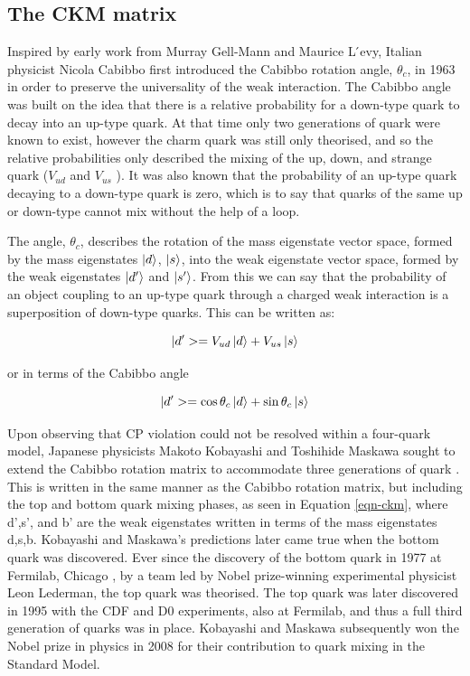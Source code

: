 \subsection{The CKM matrix}

Inspired by early work from Murray Gell-Mann and Maurice L ́evy, Italian physicist Nicola Cabibbo first introduced the Cabibbo rotation angle, $θ_c$, in 1963 \cite{PhysRevLett.10.531} in order to preserve the universality of the weak interaction. The Cabibbo angle was built on the idea that there is a relative probability for a down-type quark to decay into an up-type quark. At that time only two generations of quark were known to exist, however the charm quark was still only theorised, and so the relative probabilities only described the mixing of the up, down,
and strange quark ($V_{ud}$ and $V_{us}$ ). It was also known that the probability of an up-type quark decaying to a down-type quark is zero, which is to say that quarks of the same up or down-type cannot mix without the help of a loop.

The angle, $θ_c$, describes the rotation of the mass eigenstate vector space, formed by the mass eigenstates $\ket{d}$, $\ket{s}$, into the weak eigenstate vector space, formed by the weak eigenstates $\ket{d'}$ and $\ket{s'}$. From this we can say that the probability of an object coupling to an up-type quark through a charged weak interaction is a superposition of down-type quarks. This can be written as:

\begin{equation}
|d'> = V_{ud}\ket{d} + V_{us}\ket{s}
\end{equation}

or in terms of the Cabibbo angle 

\begin{equation}
|d'> = \cos\theta_c\ket{d} + \sin\theta_c\ket{s}
\end{equation}

Upon observing that CP violation could not be resolved within a four-quark model, Japanese physicists Makoto Kobayashi and Toshihide Maskawa sought to extend the Cabibbo rotation matrix to accommodate three generations of quark \cite{Kobayashi:1973fv}. This is written in the same manner as the Cabibbo rotation matrix, but including the top and bottom quark mixing phases, as seen in Equation \ref{eqn-ckm}, where d',s', and b' are the weak eigenstates written in terms of the mass eigenstates d,s,b. Kobayashi and Maskawa's predictions later came true when the bottom quark was discovered. Ever since the discovery of the bottom quark in 1977 at Fermilab, Chicago \cite{Innes:1977ae}, by a team led by Nobel prize-winning experimental physicist Leon Lederman, the top quark was theorised. The top quark was later discovered in 1995 with the CDF \cite{PhysRevLett.74.2626} and D0 \cite{PhysRevLett.74.2422} experiments, also at Fermilab, and thus a full third generation of quarks was in place. Kobayashi and Maskawa subsequently won the Nobel prize in physics in 2008 for their contribution to quark mixing in the Standard Model.   


